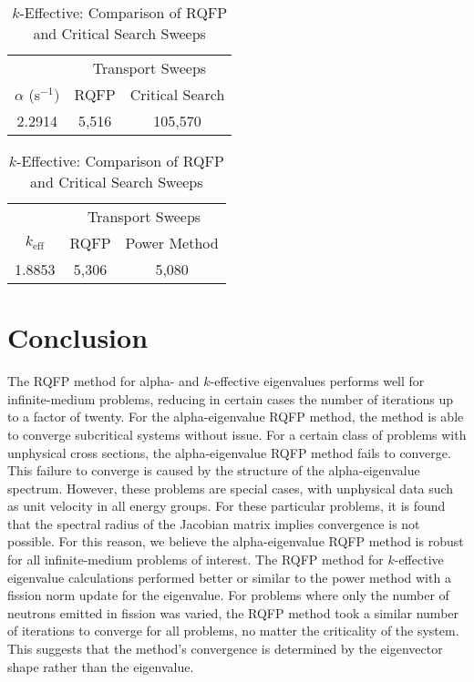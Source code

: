 \begin{table}[!htbp]
	\caption{Transport Sweep Comparisons for Problem 5.2.2.3}
	\begin{subtable}[h]{1.0\textwidth}
	\centering{}
	\begin{tabular}{@{}ccc@{}}\toprule
	& \multicolumn{2}{c}{Transport Sweeps} \\
	\cmidrule{2-3} $\alpha$  (s$^{-1}) $& RQFP & Critical Search \\
	\midrule
	2.2914 & 5,516 & 105,570 \\
	\bottomrule
	\end{tabular}
	\caption{Alpha-Eigenvalue: Comparison of RQFP and Critical Search Sweeps}
	\label{table:AlphaProb5223}
	\end{subtable}%
	\vspace{0.25cm}
	\begin{subtable}[h]{1.0\textwidth}
	\centering{}
	\begin{tabular}{@{}ccc@{}}\toprule
	& \multicolumn{2}{c}{Transport Sweeps} \\
	\cmidrule{2-3} $k_{\text{eff}}$ & RQFP & Power Method \\
	\midrule
	1.8853 & 5,306 & 5,080 \\
	\bottomrule
	\end{tabular}
	\caption{$k$-Effective: Comparison of RQFP and Critical Search Sweeps}
	\label{table:kProb5223}
	\end{subtable}%
\end{table}


\label{sec:Res}

\section{Conclusion}

The RQFP method for alpha- and $k$-effective eigenvalues performs well for infinite-medium problems, reducing in certain cases the number of iterations up to a factor of twenty. For the alpha-eigenvalue RQFP method, the method is able to converge subcritical systems without issue. For a certain class of problems with unphysical cross sections, the alpha-eigenvalue RQFP method fails to converge. This failure to converge is caused by the structure of the alpha-eigenvalue spectrum. However, these problems are special cases, with unphysical data such as unit velocity in all energy groups. For these particular problems, it is found that the spectral radius of the Jacobian matrix implies convergence is not possible. For this reason, we believe the alpha-eigenvalue RQFP method is robust for all infinite-medium problems of interest. The RQFP method for $k$-effective eigenvalue calculations performed better or similar to the power method with a fission norm update for the eigenvalue. For problems where only the number of neutrons emitted in fission was varied, the RQFP method took a similar number of iterations to converge for all problems, no matter the criticality of the system. This suggests that the method's convergence is determined by the eigenvector shape rather than the eigenvalue.

